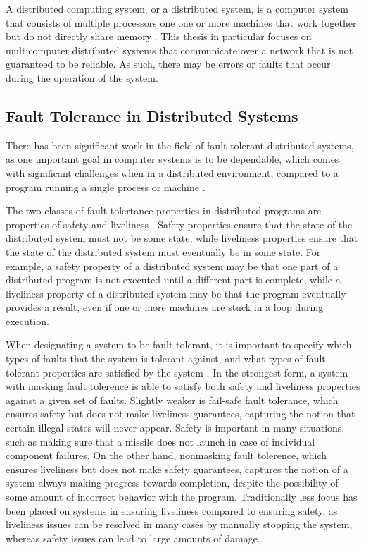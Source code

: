 \documentclass[twoside]{report}
\begin{document}
A distributed computing system, or a distributed system, is a computer system that consists of multiple processors one one or more machines that work together but do not directly share memory \cite{10.1145/72551.72552}.
This thesis in particular focuses on multicomputer distributed systems that communicate over a network that is not guaranteed to be reliable. 
As such, there may be errors or faults that occur during the operation of the system.

\subsection{Fault Tolerance in Distributed Systems}
There has been significant work in the field of fault tolerant distributed systems, as one important goal in computer systems is to be dependable, which comes with significant challenges when in a distributed environment, compared to a program running a single process or machine \cite{10.1145/311531.311532}.

The two classes of fault tolertance properties in distributed programs are properties of safety and liveliness \cite{1702415}.
Safety properties ensure that the state of the distributed system must not be some state, while liveliness properties ensure that the state of the distributed system must eventually be in some state.
For example, a safety property of a distributed system may be that one part of a distributed program is not executed until a different part is complete, while a liveliness property of a distributed system may be that the program eventually provides a result, even if one or more machines are stuck in a loop during execution.

When designating a system to be fault tolerant, it is important to specify which types of faults that the system is tolerant against, and what types of fault tolerant properties are satisfied by the system \cite{10.1145/311531.311532}.
In the strongest form, a system with masking fault tolerence is able to satisfy both safety and liveliness properties against a given set of faults.
Slightly weaker is fail-safe fault tolerance, which ensures safety but does not make liveliness guarantees, capturing the notion that certain illegal states will never appear.
Safety is important in many situations, such as making sure that a missile does not launch in case of individual component failures.
On the other hand, nonmasking fault tolerence, which ensures liveliness but does not make safety guarantees, captures the notion of a system always making progress towards completion, despite the possibility of some amount of incorrect behavior with the program.
Traditionally less focus has been placed on systems in ensuring liveliness compared to ensuring safety, as liveliness issues can be resolved in many cases by manually stopping the system, whereas safety issues can lead to large amounts of damage.
\end{document}
